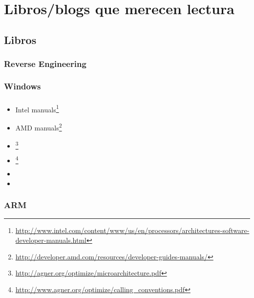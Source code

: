 \chapter{Libros/blogs que merecen lectura}

\section{Libros}

\subsection{Reverse Engineering}




\subsection{Windows}



\subsection{\CCpp}



\label{x86_manuals}
\begin{itemize}
\item Intel manuals\footnote{\AlsoAvailableAs \url{http://www.intel.com/content/www/us/en/processors/architectures-software-developer-manuals.html}}

\item AMD manuals\footnote{\AlsoAvailableAs \url{http://developer.amd.com/resources/developer-guides-manuals/}}

\item \AgnerFog{}\footnote{\AlsoAvailableAs \url{http://agner.org/optimize/microarchitecture.pdf}}

\item \AgnerFogCC{}\footnote{\AlsoAvailableAs \url{http://www.agner.org/optimize/calling_conventions.pdf}}

\item \IntelOptimization

\item \AMDOptimization
\end{itemize}

\subsection{ARM}

